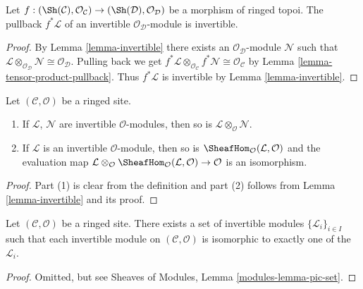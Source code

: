 \begin{lemma}
\label{lemma-pullback-invertible}
Let $f : (\Sh(\mathcal{C}), \mathcal{O}_\mathcal{C}) \to
(\Sh(\mathcal{D}), \mathcal{O}_\mathcal{D})$ be a
morphism of ringed topoi. The pullback $f^*\mathcal{L}$ of an
invertible $\mathcal{O}_\mathcal{D}$-module is invertible.
\end{lemma}

\begin{proof}
By Lemma \ref{lemma-invertible}
there exists an $\mathcal{O}_\mathcal{D}$-module $\mathcal{N}$ such that
$\mathcal{L} \otimes_{\mathcal{O}_\mathcal{D}} \mathcal{N} \cong
\mathcal{O}_\mathcal{D}$. Pulling back we get
$f^*\mathcal{L} \otimes_{\mathcal{O}_\mathcal{C}} f^*\mathcal{N} \cong
\mathcal{O}_\mathcal{C}$
by Lemma \ref{lemma-tensor-product-pullback}.
Thus $f^*\mathcal{L}$ is invertible by Lemma \ref{lemma-invertible}.
\end{proof}

\begin{lemma}
\label{lemma-constructions-invertible}
Let $(\mathcal{C}, \mathcal{O})$ be a ringed site.
\begin{enumerate}
\item If $\mathcal{L}$, $\mathcal{N}$ are invertible
$\mathcal{O}$-modules, then so is
$\mathcal{L} \otimes_\mathcal{O} \mathcal{N}$.
\item If $\mathcal{L}$ is an invertible
$\mathcal{O}$-module, then so is
$\SheafHom_\mathcal{O}(\mathcal{L}, \mathcal{O})$ and the evaluation map
$\mathcal{L} \otimes_\mathcal{O}
\SheafHom_\mathcal{O}(\mathcal{L}, \mathcal{O}) \to \mathcal{O}$
is an isomorphism.
\end{enumerate}
\end{lemma}

\begin{proof}
Part (1) is clear from the definition and part (2) follows from
Lemma \ref{lemma-invertible} and its proof.
\end{proof}

\begin{lemma}
\label{lemma-pic-set}
Let $(\mathcal{C}, \mathcal{O})$ be a ringed site.
There exists a set of invertible modules $\{\mathcal{L}_i\}_{i \in I}$
such that each invertible module on $(\mathcal{C}, \mathcal{O})$
is isomorphic to exactly one of the $\mathcal{L}_i$.
\end{lemma}

\begin{proof}
Omitted, but see Sheaves of Modules, Lemma \ref{modules-lemma-pic-set}.
\end{proof}

